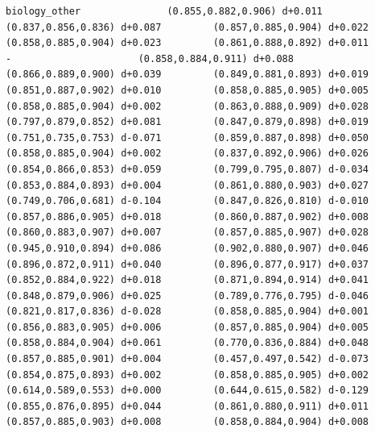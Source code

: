 \documentclass[11pt, letterpaper, openany]{book}
\begin{document}
\begin{empiricalbox}
\begin{lstlisting}[style=terminal]
biology_other               (0.855,0.882,0.906) d+0.011         (0.837,0.856,0.836) d+0.087         (0.857,0.885,0.904) d+0.022         (0.858,0.885,0.904) d+0.023         (0.861,0.888,0.892) d+0.011                      -                      (0.858,0.884,0.911) d+0.088         (0.866,0.889,0.900) d+0.039         (0.849,0.881,0.893) d+0.019         (0.851,0.887,0.902) d+0.010         (0.858,0.885,0.905) d+0.005         (0.858,0.885,0.904) d+0.002         (0.863,0.888,0.909) d+0.028         (0.797,0.879,0.852) d+0.081         (0.847,0.879,0.898) d+0.019         (0.751,0.735,0.753) d-0.071         (0.859,0.887,0.898) d+0.050         (0.858,0.885,0.904) d+0.002         (0.837,0.892,0.906) d+0.026         (0.854,0.866,0.853) d+0.059         (0.799,0.795,0.807) d-0.034         (0.853,0.884,0.893) d+0.004         (0.861,0.880,0.903) d+0.027         (0.749,0.706,0.681) d-0.104         (0.847,0.826,0.810) d-0.010         (0.857,0.886,0.905) d+0.018         (0.860,0.887,0.902) d+0.008         (0.860,0.883,0.907) d+0.007         (0.857,0.885,0.907) d+0.028         (0.945,0.910,0.894) d+0.086         (0.902,0.880,0.907) d+0.046         (0.896,0.872,0.911) d+0.040         (0.896,0.877,0.917) d+0.037         (0.852,0.884,0.922) d+0.018         (0.871,0.894,0.914) d+0.041         (0.848,0.879,0.906) d+0.025         (0.789,0.776,0.795) d-0.046         (0.821,0.817,0.836) d-0.028         (0.858,0.885,0.904) d+0.001         (0.856,0.883,0.905) d+0.006         (0.857,0.885,0.904) d+0.005         (0.858,0.884,0.904) d+0.061         (0.770,0.836,0.884) d+0.048         (0.857,0.885,0.901) d+0.004         (0.457,0.497,0.542) d-0.073         (0.854,0.875,0.893) d+0.002         (0.858,0.885,0.905) d+0.002         (0.614,0.589,0.553) d+0.000         (0.644,0.615,0.582) d-0.129         (0.855,0.876,0.895) d+0.044         (0.861,0.880,0.911) d+0.011         (0.857,0.885,0.903) d+0.008         (0.858,0.884,0.904) d+0.008     

\end{lstlisting}
\end{empiricalbox}
\end{document}
